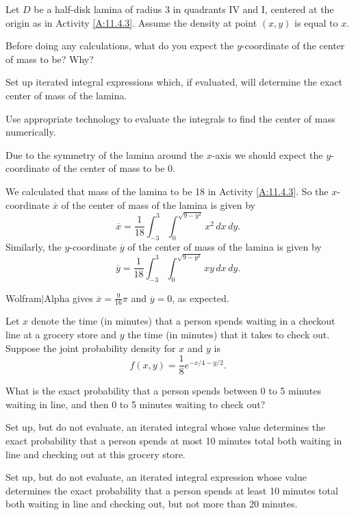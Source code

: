\begin{exercises}
\begin{exerciseSolution}
\ea
\end{exerciseSolution}

\item Let $D$ be a half-disk lamina of radius 3 in quadrants IV and I, centered at the origin as in Activity \ref{A:11.4.3}.  Assume the density at point $(x,y)$ is equal to $x$. 
	\ba 
	    \item Before doing any calculations, what do you expect the $y$-coordinate of the center of mass to be? Why? 
	    \item Set up iterated integral expressions which, if evaluated, will determine the exact center of mass of the lamina. 
	    \item Use appropriate technology to evaluate the integrals to find the center of mass numerically.
	 \ea 
\begin{exerciseSolution}
	\ba
	\item Due to the symmetry of the lamina around the $x$-axis we should expect the $y$-coordinate of the center of mass to be 0. 

	\item We calculated that mass of the lamina to be 18 in Activity \ref{A:11.4.3}. So the $x$-coordinate $\overline{x}$ of the center of mass of the lamina is given by 
\[\overline{x} = \frac{1}{18} \int_{-3}^{3} \int_{0}^{\sqrt{9-y^2}} x^2 \, dx \, dy.\]
Similarly, the $y$-coordinate $\overline{y}$ of the center of mass of the lamina is given by  
\[\overline{y} = \frac{1}{18} \int_{-3}^{3} \int_{0}^{\sqrt{9-y^2}} xy \, dx \, dy.\]

	\item Wolfram$|$Alpha gives $\overline{x} = \frac{9}{16} \pi$ and $\overline{y} = 0$, as expected.   
	\ea
\end{exerciseSolution}

\item Let $x$ denote the time (in minutes) that a person spends waiting in a checkout line at a grocery store and $y$ the time (in minutes) that it takes to check out.  Suppose the joint probability density for $x$ and $y$ is
\[f(x,y) = \frac{1}{8} e^{-x/4-y/2}.\]

	\ba
		\item What is the exact probability that a person spends between 0 to 5 minutes waiting in line, and then 0 to 5 minutes waiting to check out?
		\item Set up, but do not evaluate, an iterated integral whose value determines the exact probability that a person spends at most 10 minutes total both waiting in line and checking out at this grocery store.
		\item Set up, but do not evaluate, an iterated integral expression whose value determines the exact probability that a person spends at least 10 minutes total both waiting in line and checking out, but not more than 20 minutes.
	\ea


\end{exercises}
